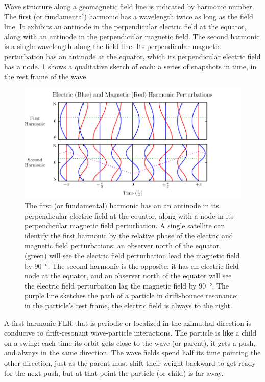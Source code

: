 Wave structure along a geomagnetic field line is indicated by harmonic number. The first (or fundamental) harmonic has a wavelength twice as long as the field line. It exhibits an antinode in the perpendicular electric field at the equator, along with an antinode in the perpendicular magnetic field. The second harmonic is a single wavelength along the field line. Its perpendicular magnetic perturbation has an antinode at the equator, which its perpendicular electric field has a node. \cref{fig_harmonics} shows a qualitative sketch of each: a series of snapshots in time, in the rest frame of the wave. 

\begin{figure}[!htb]
    \centering
    \includegraphics[width=\textwidth]{figures/harmonics.pdf}
    \caption[First and Second Harmonic Resonances]{
      The first (or fundamental) harmonic has an an antinode in its perpendicular electric field at the equator, along with a node in its perpendicular magnetic field perturbation. A single satellite can identify the first harmonic by the relative phase of the electric and magnetic field perturbations: an observer north of the equator (green) will see the electric field perturbation lead the magnetic field by \SI{90}{\degree}. The second harmonic is the opposite: it has an electric field node at the equator, and an observer north of the equator will see the electric field perturbation lag the magnetic field by \SI{90}{\degree}. The purple line sketches the path of a particle in drift-bounce resonance; in the particle's rest frame, the electric field is always to the right. 
    }
    \label{fig_harmonics}
\end{figure}

A first-harmonic FLR that is periodic or localized in the azimuthal direction is conducive to drift-resonant wave-particle interactions\cite{dai_2013,poulter_1983}. The particle is like a child on a swing: each time its orbit gets close to the wave (or parent), it gets a push, and always in the same direction. The wave fields spend half its time pointing the other direction, just as the parent must shift their weight backward to get ready for the next push, but at that point the particle (or child) is far away. 

